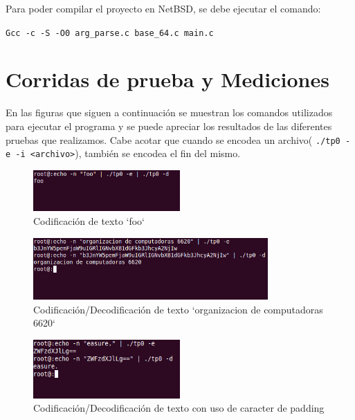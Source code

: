 \documentclass[a4paper,10pt,oneside]{article}
\begin{document}
	Para poder compilar el proyecto en NetBSD, se debe ejecutar el comando:
	
	\begin{center}
	\texttt{Gcc -c -S -O0 arg\_parse.c base\_64.c main.c} 
	\end{center}
	
	
\section{Corridas de prueba y Mediciones}

	En las figuras que siguen a continuación se muestran los comandos utilizados para ejecutar el programa y se puede apreciar los resultados de las diferentes pruebas que realizamos. Cabe acotar que cuando se encodea un archivo( \texttt{./tp0 -e -i <archivo>}), también se encodea el fin del mismo. \newpage
	
	\begin{figure}[H]
		\begin{center}
			\includegraphics[width=0.50\textwidth]{test1.png}
		\end{center}
		\caption{Codificación de texto `foo`} \label{Figura 1}
	\end{figure}

	\begin{figure}[H]
		\begin{center}
			\includegraphics[width=0.80\textwidth]{test2.png}
		\end{center}
		\caption{Codificación/Decodificación de texto `organizacion de computadoras 6620`} \label{Figura 2}
	\end{figure}

	\begin{figure}[H]
		\begin{center}
			\includegraphics[width=0.50\textwidth]{test3.png}
		\end{center}
		\caption{Codificación/Decodificación de texto con uso de caracter de padding} \label{Figura 3}
	\end{figure}
	
\end{document}
